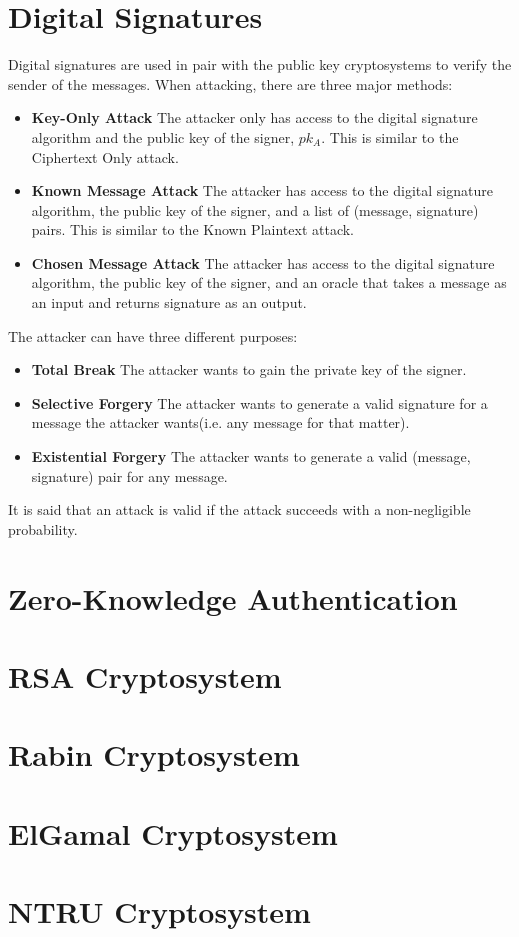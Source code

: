 \documentclass{report}
\begin{document}
	\section{Digital Signatures}
		Digital signatures are used in pair with the public key cryptosystems to verify the sender of the messages. When attacking, there are three major methods:
		\begin{itemize}
			\item \textbf{Key-Only Attack}
			\subitem The attacker only has access to the digital signature algorithm and the public key of the signer, $pk_A$. This is similar to the Ciphertext Only attack.
			\item \textbf{Known Message Attack}
			\subitem The attacker has access to the digital signature algorithm, the public key of the signer, and a list of (message, signature) pairs. This is similar to the Known Plaintext attack.
			\item \textbf{Chosen Message Attack}
			\subitem The attacker has access to the digital signature algorithm, the public key of the signer, and an oracle that takes a message as an input and returns signature as an output.
		\end{itemize}
		The attacker can have three different purposes:
		\begin{itemize}
			\item \textbf{Total Break}
			\subitem The attacker wants to gain the private key of the signer.
			\item \textbf{Selective Forgery}
			\subitem The attacker wants to generate a valid signature for a message the attacker wants(i.e. any message for that matter).
			\item \textbf{Existential Forgery}
			\subitem The attacker wants to generate a valid (message, signature) pair for any message.
		\end{itemize}
		It is said that an attack is valid if the attack succeeds with a non-negligible probability.
		
	\section{Zero-Knowledge Authentication}
		
		
	\section{RSA Cryptosystem}
		
		
	\section{Rabin Cryptosystem}
		
		
	\section{ElGamal Cryptosystem}
		
		
	\section{NTRU Cryptosystem}
		
		
\end{document}
